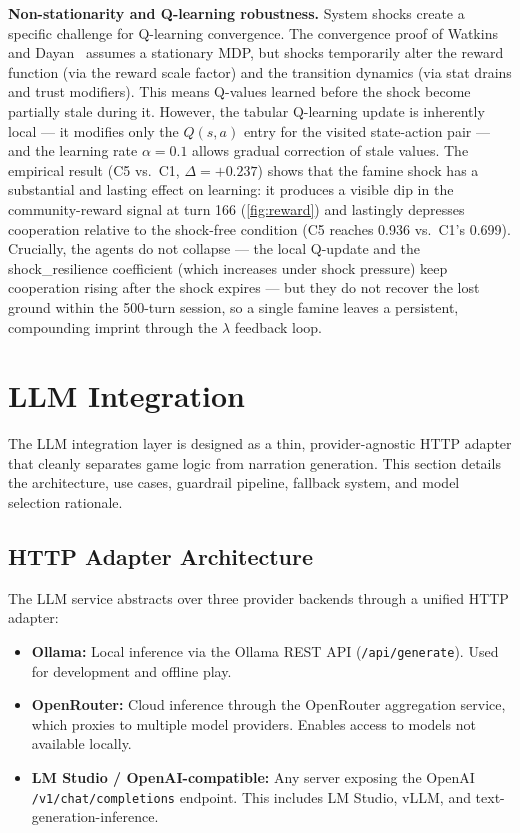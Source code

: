 \documentclass[12pt, a4paper, oneside]{report}
\begin{document}
\textbf{Non-stationarity and Q-learning robustness.}
System shocks create a specific challenge for Q-learning convergence. The convergence proof of Watkins and Dayan~\cite{watkins1992qlearning} assumes a stationary MDP, but shocks temporarily alter the reward function (via the reward scale factor) and the transition dynamics (via stat drains and trust modifiers). This means Q-values learned before the shock become partially stale during it. However, the tabular Q-learning update is inherently local --- it modifies only the $Q(s,a)$ entry for the visited state-action pair --- and the learning rate $\alpha = 0.1$ allows gradual correction of stale values. The empirical result (C5 vs.\ C1, $\Delta = +0.237$) shows that the famine shock has a substantial and lasting effect on learning: it produces a visible dip in the community-reward signal at turn 166 (\cref{fig:reward}) and lastingly depresses cooperation relative to the shock-free condition (C5 reaches 0.936 vs.\ C1's 0.699). Crucially, the agents do not collapse --- the local Q-update and the shock\_resilience coefficient (which increases under shock pressure) keep cooperation rising after the shock expires --- but they do not recover the lost ground within the 500-turn session, so a single famine leaves a persistent, compounding imprint through the $\lambda$ feedback loop.

\section{LLM Integration}
\label{sec:llm-integration}

The LLM integration layer is designed as a thin, provider-agnostic HTTP adapter that cleanly separates game logic from narration generation. This section details the architecture, use cases, guardrail pipeline, fallback system, and model selection rationale.

\subsection{HTTP Adapter Architecture}

The LLM service abstracts over three provider backends through a unified HTTP adapter:

\begin{itemize}[nosep]
    \item \textbf{Ollama:} Local inference via the Ollama REST API (\texttt{/api/generate}). Used for development and offline play.
    \item \textbf{OpenRouter:} Cloud inference through the OpenRouter aggregation service, which proxies to multiple model providers. Enables access to models not available locally.
    \item \textbf{LM Studio / OpenAI-compatible:} Any server exposing the OpenAI \texttt{/v1/chat/completions} endpoint. This includes LM Studio, vLLM, and text-generation-inference.
\end{itemize}
\end{document}
